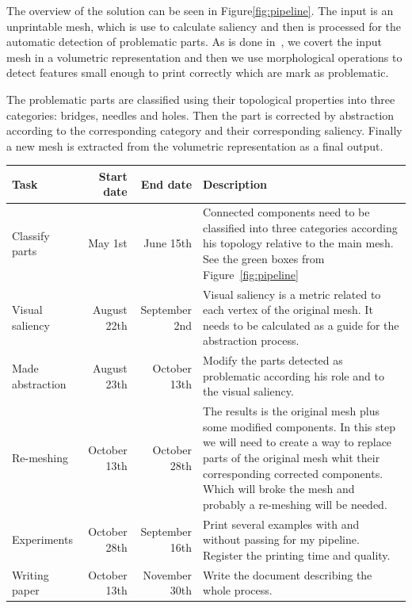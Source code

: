 \begin{enumerate}
	The overview of the solution can be seen in Figure\ref{fig:pipeline}. The input is an unprintable mesh, which is use to calculate saliency and then is processed for the automatic detection of problematic parts. As is done in~\cite{Telea2011}, we covert the input mesh in a volumetric representation and then we use morphological operations to detect features small enough to print correctly which are mark as problematic.
	
	The problematic parts are classified using their topological properties into three categories: bridges, needles and holes. Then the part is corrected by abstraction according to the corresponding category and their corresponding saliency. Finally a new mesh is extracted from the volumetric representation as a final output.
	
	\begin{center}
    \begin{tabular}{| l | r | r || p{9cm} |}
    \hline
			Task & Start date & End date & Description \\ 
			\hline
			Classify parts & May 1st & June 15th & Connected components need to be classified into three categories according his topology relative to the main mesh. See the green boxes from Figure~\ref{fig:pipeline}\\ 
			Visual saliency & August 22th & September 2nd & Visual saliency is a metric related to each vertex of the original mesh. It needs to be calculated as a guide for the abstraction process.\\ 
			Made abstraction & August 23th & October 13th & Modify the parts detected as problematic according his role and to the visual saliency. \\ 
			Re-meshing & October 13th & October 28th & The results is the original mesh plus some modified components. In this step we will need to create a way to replace parts of the original mesh whit their corresponding corrected components. Which will broke the mesh and probably a re-meshing will be needed. \\ 
			Experiments & October 28th & September 16th & Print several examples with and without passing for my pipeline. Register the printing time and quality. \\ 
			Writing paper & October 13th & November 30th & Write the document describing the whole process. \\ 
			\hline
    \end{tabular}
	\end{center}
	

\end{enumerate}
